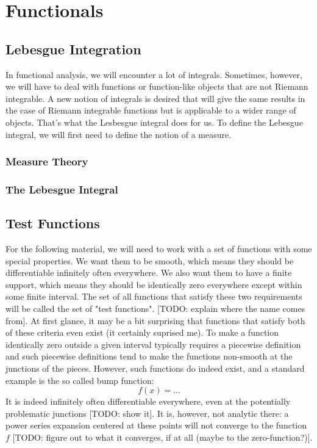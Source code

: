 \section{Functionals} 

\subsection{Lebesgue Integration}
In functional analysis, we will encounter a lot of integrals. Sometimes, however, we will have to deal with functions or function-like objects that are not Riemann integrable. A new notion of integrals is desired that will give the same results in the case of Riemann integrable functions but is applicable to a wider range of objects. That's what the Lesbesgue integral does for us. To define the Lebesgue integral, we will first need to define the notion of a measure.

\subsubsection{Measure Theory}

\subsubsection{The Lebesgue Integral}


\subsection{Test Functions}
For the following material, we will need to work with a set of functions with some special properties. We want them to be smooth, which means they should be differentiable infinitely often everywhere. We also want them to have a finite support, which means they should be identically zero everywhere except within some finite interval. The set of all functions that satisfy these two requirements will be called the set of "test functions". [TODO: explain where the name comes from]. At first glance, it may be a bit surprising that functions that satisfy both of these criteria even exist (it certainly suprised me). To make a function identically zero outside a given interval typically requires a piecewise definition and such piecewise definitions tend to make the functions non-smooth at the junctions of the pieces. However, such functions do indeed exist, and a standard example is the so called bump function:
\begin{equation}
 f(x) = ...
\end{equation}
It is indeed infinitely often differentiable everywhere, even at the potentially problematic junctions [TODO: show it]. It is, however, not analytic there: a power series expansion centered at these points will not converge to the function $f$ [TODO: figure out to what it converges, if at all (maybe to the zero-function?)].


